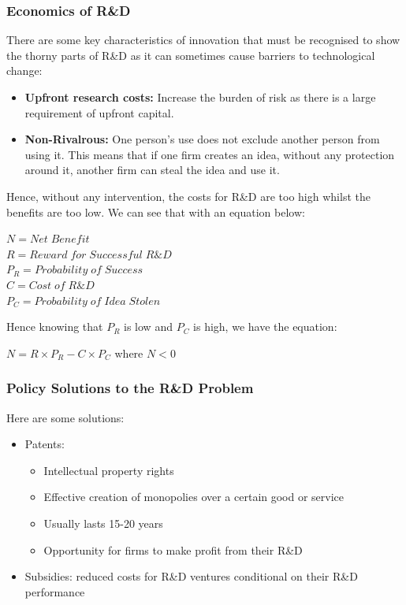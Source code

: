 \documentclass[12pt, letterpaper]{article}
\begin{document}
\subsubsection{Economics of R\&D}
There are some key characteristics of innovation that must be recognised to show the thorny parts of R\&D as it can sometimes cause barriers to technological change:
\begin{itemize}
	\item \textbf{Upfront research costs:} Increase the burden of risk as there is a large requirement of upfront capital.
	\item \textbf{Non-Rivalrous:} One person's use does not exclude another person from using it. This means that if one firm creates an idea, without any protection around it, another firm can steal the idea and use it.
\end{itemize}
Hence, without any intervention, the costs for R\&D are too high whilst the benefits are too low. We can see that with an equation below:
\begin{center}
$N = Net\;Benefit$ \\ $R = Reward\;for\;Successful\;R\&D$ \\ $P_R = Probability\;of\;Success$ \\ $C = Cost\;of\;R\&D$ \\ $P_C = Probability\;of\;Idea\;Stolen$
\end{center}
Hence knowing that $P_R$ is low and $P_C$ is high, we have the equation:
\begin{center}
$N = R \times P_R - C\times P_C$ where $N<0$
\end{center}

\subsubsection{Policy Solutions to the R\&D Problem}
Here are some solutions:
\begin{itemize}
	\item Patents:
		\begin{itemize}
			\item Intellectual property rights
			\item Effective creation of monopolies over a certain good or service
			\item Usually lasts 15-20 years
			\item Opportunity for firms to make profit from their R\&D
		\end{itemize}
	\item Subsidies: reduced costs for R\&D ventures conditional on their R\&D performance
\end{itemize}
\end{document}
